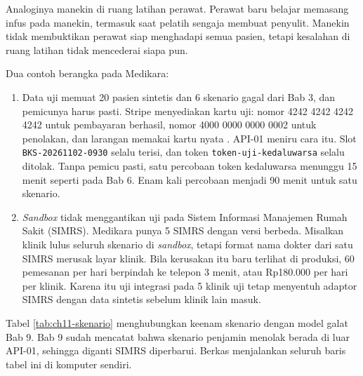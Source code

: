 Analoginya manekin di ruang latihan perawat. Perawat baru belajar memasang infus pada manekin, termasuk saat pelatih sengaja
membuat penyulit. Manekin tidak membuktikan perawat siap menghadapi semua pasien, tetapi kesalahan di ruang latihan tidak
mencederai siapa pun.

Dua contoh berangka pada Medikara:
\begin{enumerate}
  \item Data uji memuat 20 pasien sintetis dan 6 skenario gagal dari Bab 3, dan pemicunya harus pasti. Stripe menyediakan
        kartu uji: nomor 4242 4242 4242 4242 untuk pembayaran berhasil, nomor 4000 0000 0000 0002 untuk penolakan, dan
        larangan memakai kartu nyata \cite{c11-stripe-testing}. API-01 meniru cara itu. Slot \texttt{BKS-20261102-0930}
        selalu terisi, dan token \texttt{token-uji-kedaluwarsa} selalu ditolak. Tanpa pemicu pasti, satu percobaan token
        kedaluwarsa menunggu 15 menit seperti pada Bab 6. Enam kali percobaan menjadi 90 menit untuk satu skenario.
  \item \textit{Sandbox} tidak menggantikan uji pada Sistem Informasi Manajemen Rumah Sakit (SIMRS). Medikara punya 5 SIMRS
        dengan versi berbeda. Misalkan klinik lulus seluruh skenario di \textit{sandbox}, tetapi format nama dokter dari
        satu SIMRS merusak layar klinik. Bila kerusakan itu baru terlihat di produksi, 60 pemesanan per hari berpindah ke
        telepon 3 menit, atau Rp180.000 per hari per klinik. Karena itu uji integrasi pada 5 klinik uji tetap menyentuh
        adaptor SIMRS dengan data sintetis sebelum klinik lain masuk.
\end{enumerate}

Tabel \ref{tab:ch11-skenario} menghubungkan keenam skenario dengan model galat Bab 9. Bab 9 sudah mencatat bahwa skenario
penjamin menolak berada di luar API-01, sehingga diganti SIMRS diperbarui. Berkas
 menjalankan seluruh baris tabel ini di komputer sendiri.

